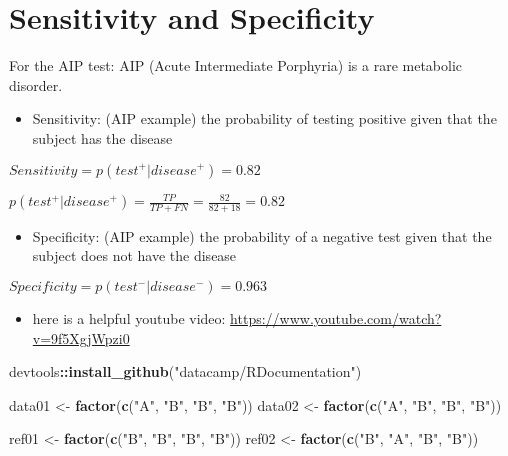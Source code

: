 \documentclass[
]{article}
\newenvironment{Shaded}{\begin{snugshade}}{\end{snugshade}}
\newcommand{\KeywordTok}[1]{\textcolor[rgb]{0.13,0.29,0.53}{\textbf{#1}}}
\newcommand{\NormalTok}[1]{#1}
\newcommand{\OperatorTok}[1]{\textcolor[rgb]{0.81,0.36,0.00}{\textbf{#1}}}
\newcommand{\StringTok}[1]{\textcolor[rgb]{0.31,0.60,0.02}{#1}}
\providecommand{\tightlist}{%
  \setlength{\itemsep}{0pt}\setlength{\parskip}{0pt}}
\begin{document}
\hypertarget{sensitivity-and-specificity}{%
\section{Sensitivity and
Specificity}\label{sensitivity-and-specificity}}

For the AIP test: AIP (Acute Intermediate Porphyria) is a rare metabolic
disorder.

\begin{itemize}
\tightlist
\item
  Sensitivity: (AIP example) the probability of testing positive given
  that the subject has the disease
\end{itemize}

\(Sensitivity = p(test^+|disease^+)=0.82\)

\(p(test^+|disease^+) = \frac{TP}{TP+FN}=\frac{82}{82+18}=0.82\)

\begin{itemize}
\tightlist
\item
  Specificity: (AIP example) the probability of a negative test given
  that the subject does not have the disease
\end{itemize}

\(Specificity = p(test^-|disease^-)=0.963\)

\begin{itemize}
\tightlist
\item
  here is a helpful youtube video:
  \url{https://www.youtube.com/watch?v=9f5XgjWpzi0}
\end{itemize}

\begin{Shaded}
\begin{Highlighting}[]
\NormalTok{devtools}\OperatorTok{::}\KeywordTok{install_github}\NormalTok{(}\StringTok{"datacamp/RDocumentation"}\NormalTok{)}

\NormalTok{data01 <-}\StringTok{ }\KeywordTok{factor}\NormalTok{(}\KeywordTok{c}\NormalTok{(}\StringTok{"A"}\NormalTok{, }\StringTok{"B"}\NormalTok{, }\StringTok{"B"}\NormalTok{, }\StringTok{"B"}\NormalTok{))}
\NormalTok{data02 <-}\StringTok{ }\KeywordTok{factor}\NormalTok{(}\KeywordTok{c}\NormalTok{(}\StringTok{"A"}\NormalTok{, }\StringTok{"B"}\NormalTok{, }\StringTok{"B"}\NormalTok{, }\StringTok{"B"}\NormalTok{))}

\NormalTok{ref01 <-}\StringTok{ }\KeywordTok{factor}\NormalTok{(}\KeywordTok{c}\NormalTok{(}\StringTok{"B"}\NormalTok{, }\StringTok{"B"}\NormalTok{, }\StringTok{"B"}\NormalTok{, }\StringTok{"B"}\NormalTok{))}
\NormalTok{ref02 <-}\StringTok{ }\KeywordTok{factor}\NormalTok{(}\KeywordTok{c}\NormalTok{(}\StringTok{"B"}\NormalTok{, }\StringTok{"A"}\NormalTok{, }\StringTok{"B"}\NormalTok{, }\StringTok{"B"}\NormalTok{))}
\end{Highlighting}
\end{Shaded}
\end{document}
